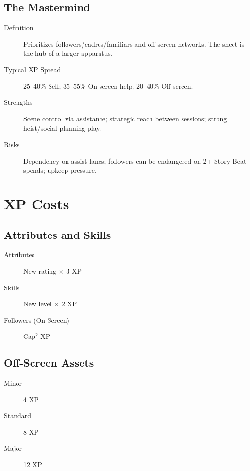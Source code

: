 \subsection{The Mastermind}

\begin{description}
\item[Definition] Prioritizes followers/cadres/familiars and off-screen networks. The sheet is the hub of a larger apparatus.
\item[Typical XP Spread] 25--40\% Self; 35--55\% On-screen help; 20--40\% Off-screen.
\item[Strengths] Scene control via assistance; strategic reach between sessions; strong heist/social-planning play.
\item[Risks] Dependency on assist lanes; followers can be endangered on 2+ Story Beat spends; upkeep pressure.
\end{description}

\section{XP Costs}

\subsection{Attributes and Skills}

\begin{description}
\item[Attributes] New rating $\times$ 3 XP
\item[Skills] New level $\times$ 2 XP
\item[Followers (On-Screen)] Cap$^2$ XP
\end{description}

\subsection{Off-Screen Assets}

\begin{description}
\item[Minor] 4 XP
\item[Standard] 8 XP
\item[Major] 12 XP
\end{description}

